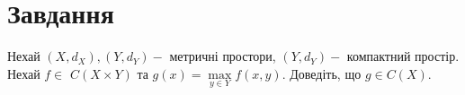 
\chapter{Завдання \theHchapter}

\begin{tcolorbox}[title=Завдання]
    Нехай $\left(X, d_{X}\right),\left(Y, d_{Y}\right)-$ метричні простори, 
    $\left(Y, d_{Y}\right)-$ компактний простір. 
    Нехай $f \in$ $C(X \times Y)$ та 
    $g(x)=\max\limits _{y \in Y} f(x, y)$. 
    Доведіть, що $g \in C(X)$.
\end{tcolorbox}



